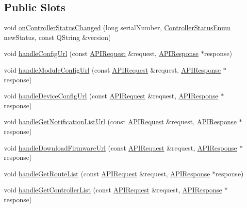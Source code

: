 \subsection*{Public Slots}
\begin{DoxyCompactItemize}
\item 
void \hyperlink{class_a_p_i_controller_ab26bfad170bcd84e1b2763a0798702ad}{on\+Controller\+Status\+Changed} (long serial\+Number, \hyperlink{_global_defs_8h_a51207b6a49e0da6f9978a3019d93480a}{Controller\+Status\+Enum} new\+Status, const Q\+String \&version)
\item 
void \hyperlink{class_a_p_i_controller_ac1fe4dd7b8df2e4cceb554e46bea894d}{handle\+Config\+Url} (const \hyperlink{class_a_p_i_request}{A\+P\+I\+Request} \&request, \hyperlink{class_a_p_i_response}{A\+P\+I\+Response} $\ast$response)
\item 
void \hyperlink{class_a_p_i_controller_a6274380cb71807d07d813b7e67e0c0c2}{handle\+Module\+Config\+Url} (const \hyperlink{class_a_p_i_request}{A\+P\+I\+Request} \&request, \hyperlink{class_a_p_i_response}{A\+P\+I\+Response} $\ast$response)
\item 
void \hyperlink{class_a_p_i_controller_a3d32a4cf1f6a06697b09d43a2be140cf}{handle\+Device\+Config\+Url} (const \hyperlink{class_a_p_i_request}{A\+P\+I\+Request} \&request, \hyperlink{class_a_p_i_response}{A\+P\+I\+Response} $\ast$response)
\item 
void \hyperlink{class_a_p_i_controller_a3217b84dcc811d83e4c7241a5e19c35c}{handle\+Get\+Notification\+List\+Url} (const \hyperlink{class_a_p_i_request}{A\+P\+I\+Request} \&request, \hyperlink{class_a_p_i_response}{A\+P\+I\+Response} $\ast$response)
\item 
void \hyperlink{class_a_p_i_controller_afb480d438e18a2551229810280a65806}{handle\+Download\+Firmware\+Url} (const \hyperlink{class_a_p_i_request}{A\+P\+I\+Request} \&request, \hyperlink{class_a_p_i_response}{A\+P\+I\+Response} $\ast$response)
\item 
void \hyperlink{class_a_p_i_controller_aabd8df21b8058798432d8cc117e23315}{handle\+Get\+Route\+List} (const \hyperlink{class_a_p_i_request}{A\+P\+I\+Request} \&request, \hyperlink{class_a_p_i_response}{A\+P\+I\+Response} $\ast$response)
\item 
void \hyperlink{class_a_p_i_controller_ad37a3ecaf99e3b7c43ecb4ec4873fea9}{handle\+Get\+Controller\+List} (const \hyperlink{class_a_p_i_request}{A\+P\+I\+Request} \&request, \hyperlink{class_a_p_i_response}{A\+P\+I\+Response} $\ast$response)
\item 

\end{DoxyCompactItemize}

